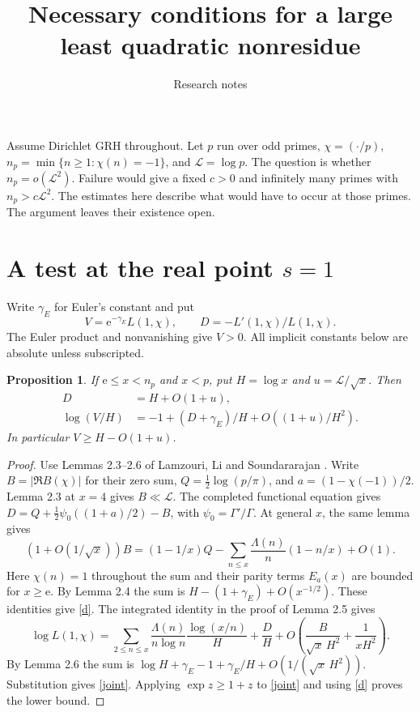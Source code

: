 \documentclass[11pt]{article}
\title{Necessary conditions for a large least quadratic nonresidue}
\author{Research notes}
\date{}
\newtheorem{proposition}{Proposition}
\newcommand{\LL}{\mathcal L}
\newcommand{\e}{\mathrm e}
\begin{document}
\maketitle
Assume Dirichlet GRH throughout. Let $p$ run over odd primes,
$\chi=(\cdot/p)$, $n_p=\min\{n\ge1:\chi(n)=-1\}$, and $\LL=\log p$.
The question is whether $n_p=o(\LL^2)$. Failure would give a fixed
$c>0$ and infinitely many primes with $n_p>c\LL^2$. The estimates here
describe what would have to occur at those primes. The argument leaves
their existence open.

\section{A test at the real point $s=1$}
Write $\gamma_E$ for Euler's constant and put
\[
 V=\e^{-\gamma_E}L(1,\chi),\qquad D=-L'(1,\chi)/L(1,\chi).
\]
The Euler product and nonvanishing give $V>0$. All implicit constants
below are absolute unless subscripted.

\begin{proposition}
If $\e\le x<n_p$ and $x<p$, put $H=\log x$ and $u=\LL/\sqrt x$. Then
\begin{align}
 D&=H+O(1+u),\label{d}\\
 \log(V/H)&=-1+(D+\gamma_E)/H+O((1+u)/H^2).\label{joint}
\end{align}
In particular $V\ge H-O(1+u)$.
\end{proposition}

\begin{proof}
Use Lemmas 2.3--2.6 of Lamzouri, Li and Soundararajan \cite{lls}.
Write $B=|\Re B(\chi)|$ for their zero sum, $Q=\tfrac12\log(p/\pi)$,
and $a=(1-\chi(-1))/2$. Lemma 2.3 at $x=4$ gives $B\ll\LL$.
The completed functional equation gives
$D=Q+\tfrac12\psi_0((1+a)/2)-B$, with $\psi_0=\Gamma'/\Gamma$.
At general $x$, the same lemma gives
\[
 (1+O(1/\sqrt x))B=(1-1/x)Q
 -\sum_{n\le x}\frac{\Lambda(n)}{n}(1-n/x)+O(1).
\]
Here $\chi(n)=1$ throughout the sum and their parity terms $E_a(x)$
are bounded for $x\ge\e$. By Lemma 2.4 the sum is
$H-(1+\gamma_E)+O(x^{-1/2})$. These identities give \eqref{d}.
The integrated identity in the proof of Lemma 2.5 gives
\[
 \log L(1,\chi)=
 \sum_{2\le n\le x}\frac{\Lambda(n)}{n\log n}\frac{\log(x/n)}{H}
 +\frac D H+O\!\left(\frac{B}{\sqrt x\,H^2}+\frac{1}{xH^2}\right).
\]
By Lemma 2.6 the sum is $\log H+\gamma_E-1+\gamma_E/H
+O(1/(\sqrt x\,H^2))$. Substitution gives \eqref{joint}. Applying
$\exp z\ge1+z$ to \eqref{joint} and using \eqref{d} proves the lower bound.
\end{proof}
\end{document}
